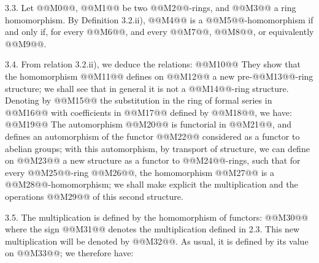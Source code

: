 3.3.
Let @@M0@@, @@M1@@ be two @@M2@@-rings, and @@M3@@ a ring homomorphism. By Definition 3.2.ii), @@M4@@ is a @@M5@@-homomorphism if and only if, for every @@M6@@, and every @@M7@@, @@M8@@, or equivalently @@M9@@.

3.4. From relation 3.2.ii), we deduce the relations:
@@M10@@
They show that the homomorphism @@M11@@ defines on @@M12@@ a new pre-@@M13@@-ring structure; we shall see that in general it is not a @@M14@@-ring structure. Denoting by @@M15@@ the substitution in the ring of formal series in @@M16@@ with coefficients in @@M17@@ defined by @@M18@@, we have:
@@M19@@
The automorphism @@M20@@ is functorial in @@M21@@, and defines an automorphism of the functor @@M22@@ considered as a functor to abelian groups; with this automorphism, by transport of structure, we can define on @@M23@@ a new structure as a functor to @@M24@@-rings, such that for every @@M25@@-ring @@M26@@, the homomorphism @@M27@@ is a @@M28@@-homomorphism; we shall make explicit the multiplication and the operations @@M29@@ of this second structure.

3.5. The multiplication is defined by the homomorphism of functors:
@@M30@@
where the sign @@M31@@ denotes the multiplication defined in 2.3. This new multiplication will be denoted by @@M32@@. As usual, it is defined by its value on @@M33@@; we therefore have:
